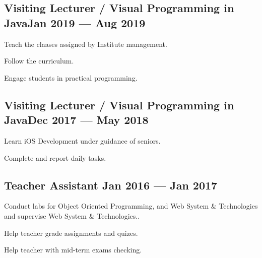 \documentclass[letter,10pt]{article}
\begin{document}
\subsection{{Visiting Lecturer / Visual Programming in Java\hfill Jan 2019 --- Aug 2019}}
\begin{zitemize}
\item Teach the claases assigned by Institute management.
\item Follow the curriculum.
\item Engage students in practical programming.
\end{zitemize}

\subsection{{Visiting Lecturer / Visual Programming in Java\hfill Dec 2017 --- May 2018}}
\begin{zitemize}
\item Learn iOS Development under guidance of seniors.
\item Complete and report daily tasks.
\end{zitemize}

\subsection{{Teacher Assistant \hfill Jan 2016 --- Jan 2017}}
\begin{zitemize}
\item Conduct labs for Object Oriented Programming, and Web System \& Technologies and supervise Web System \& Technologies..
\item Help teacher grade assignments and quizes.
\item Help teacher with mid-term exams checking.
\end{zitemize}
\end{document}
